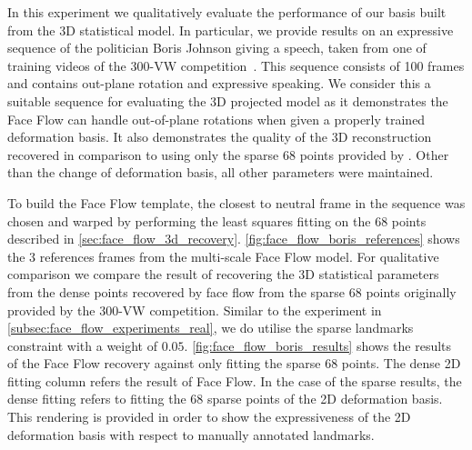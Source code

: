 In this experiment we qualitatively evaluate the performance of our basis
built from the 3D statistical model. In particular, we provide results on
an expressive sequence of the politician Boris Johnson giving a speech, taken
from one of training videos of the
300-VW competition~\cite{Chrysos:2015gt,shen2015first}. This sequence consists
of 100 frames and contains out-plane rotation and expressive speaking. We
consider this a suitable sequence for evaluating the 3D projected model
as it demonstrates the Face Flow can handle out-of-plane rotations when
given a properly trained deformation basis. It also demonstrates the quality
of the 3D reconstruction recovered in comparison to using only the sparse
68 points provided by \citet{shen2015first}. Other than the change of deformation
basis, all other parameters were maintained.

To build the Face Flow template, the closest to neutral frame in the sequence
was chosen and warped by performing the least squares fitting on the 68
points described in \cref{sec:face_flow_3d_recovery}.
\cref{fig:face_flow_boris_references} shows the 3 references frames from
the multi-scale Face Flow model. For qualitative comparison we compare the result
of recovering the 3D statistical parameters from the dense points recovered by
face flow from the sparse 68 points originally provided by the 300-VW competition.
Similar to the experiment in \cref{subsec:face_flow_experiments_real}, we do
utilise the sparse landmarks constraint with a weight of $0.05$.
\cref{fig:face_flow_boris_results} shows the results of the Face Flow recovery
against only fitting the sparse 68 points. The dense 2D fitting column refers
the result of Face Flow. In the case of the sparse results, the dense fitting
refers to fitting the 68 sparse points of the 2D deformation basis. This
rendering is provided in order to show the expressiveness of the 2D deformation
basis with respect to manually annotated landmarks.

